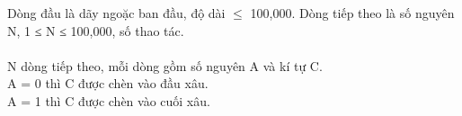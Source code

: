 Dòng đầu là dãy ngoặc ban đầu, độ dài  $\le$  100,000. Dòng tiếp theo là số nguyên N, 1 ≤ N ≤ 100,000, số thao tác.
\\
\\N dòng tiếp theo, mỗi dòng gồm số nguyên A và kí tự C.
\\A = 0 thì C được chèn vào đầu xâu.
\\A = 1 thì C được chèn vào cuối xâu.